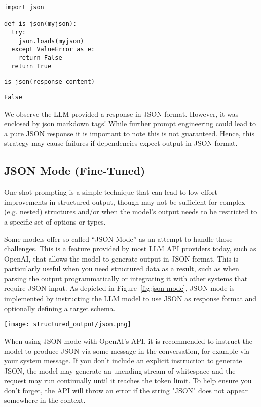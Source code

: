 \begin{verbatim}
import json

def is_json(myjson):
  try:
    json.loads(myjson)
  except ValueError as e:
    return False
  return True
\end{verbatim}

\begin{verbatim}
is_json(response_content)
\end{verbatim}

\begin{verbatim}
False
\end{verbatim}



We observe the LLM provided a response in JSON format. However, it was enclosed by json markdown tags! While further prompt engineering could lead to a pure JSON response it is important to note this is not guaranteed. Hence, this strategy may cause failures if dependencies expect output in JSON format.
\subsection{JSON Mode (Fine-Tuned)}

One-shot prompting is a simple technique that can lead to low-effort improvements in structured output, though may not be sufficient for complex (e.g. nested) structures and/or when the model's output needs to be restricted to a specific set of options or types.

Some models offer so-called ``JSON Mode'' as an attempt to handle those challenges. This is a feature provided by most LLM API providers today, such as OpenAI, that allows the model to generate output in JSON format. This is particularly useful when you need structured data as a result, such as when parsing the output programmatically or integrating it with other systems that require JSON input. As depicted in Figure~\ref{fig:json-mode}, JSON mode is implemented by instructing the LLM model to use JSON as response format and optionally defining a target schema.

\begin{figure*}[htbp]
\centering
\texttt{[image: structured\_output/json.png]}
\caption{Conceptual overview of JSON mode.}
\label{fig:json-mode}
\end{figure*}
When using JSON mode with OpenAI's API, it is recommended to instruct the model to produce JSON via some message in the conversation, for example via your system message. If you don't include an explicit instruction to generate JSON, the model may generate an unending stream of whitespace and the request may run continually until it reaches the token limit. To help ensure you don't forget, the API will throw an error if the string "JSON" does not appear somewhere in the context.


